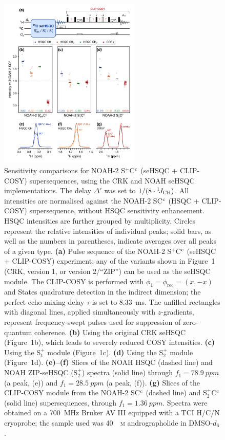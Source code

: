 \documentclass[final,twocolumn]{elsarticle}
\newcommand*{\noahCc}{C$\rm ^c$}
\newcommand*{\noahS}{S}
\newcommand*{\noahSp}{S$^+$}
\newcommand*{\noahSpa}{S$^+_1$}
\newcommand*{\noahSpb}{S$^+_2$}
\newcommand*{\onejch}{{}^{1}\!J_{\ce{CH}}}
\begin{document}
\begin{figure}[!ht]
    \centering
    \includegraphics[width=0.6\textwidth]{sehsqc_comp.png}
    \caption{
        Sensitivity comparisons for NOAH-2 \noahSp{}\noahCc{} (seHSQC + CLIP-COSY) supersequences, using the CRK and NOAH seHSQC implementations.
        The delay $\Delta'$ was set to $1/(8\cdot\onejch)$.
        All intensities are normalised against the NOAH-2 \noahS{}\noahCc{} (HSQC + CLIP-COSY) supersequence, without HSQC sensitivity enhancement.
        HSQC intensities are further grouped by multiplicity.
        Circles represent the relative intensities of individual peaks; solid bars, as well as the numbers in parentheses, indicate averages over all peaks of a given type.
        \textbf{(a)} Pulse sequence of the NOAH-2 \noahSp{}\noahCc{} (seHSQC + CLIP-COSY) experiment: any of the variants shown in Figure~1 (CRK, version 1, or version 2/``ZIP'') can be used as the seHSQC module.
        The CLIP-COSY\cite{Koos2016ACIE} is performed with $\phi_1 = \phi_{\text{rec}} = (x, -x)$ and States quadrature detection in the indirect dimension; the perfect echo mixing delay $\tau$ is set to \SI{8.33}{\ms}.
        The unfilled rectangles with diagonal lines, applied simultaneously with $z$-gradients, represent frequency-swept pulses used for suppression of zero-quantum coherence.\cite{Thrippleton2003ACIE}
        \textbf{(b)} Using the original CRK seHSQC (Figure~1b), which leads to severely reduced COSY intensities.
        \textbf{(c)} Using the \noahSpa{} module (Figure~1c).
        \textbf{(d)} Using the \noahSpb{} module (Figure~1d).
        \textbf{(e)--(f)} Slices of the NOAH HSQC (dashed line) and NOAH ZIP-seHSQC (\noahSpb{}) spectra (solid line) through $f_1 = \SI{78.9}{ppm}$ (a  peak, (e)) and $f_1 = \SI{28.5}{ppm}$ (a  peak, (f)).
        \textbf{(g)} Slices of the CLIP-COSY module from the NOAH-2 \noahS{}\noahCc{} (dashed line) and \noahSpb{}\noahCc{} (solid line) supersequences, through $f_1 = \SI{1.36}{ppm}$.
        Spectra were obtained on a \SI{700}{\MHz} Bruker AV III equipped with a TCI H/C/N cryoprobe; the sample used was \SI{40}{\milli\textsc{m}} andrographolide in DMSO-$d_6$.
    }
    \label{fig:sehsqc_comp}
\end{figure}
\end{document}
